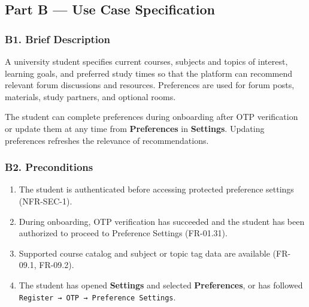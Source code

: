 \documentclass[12pt]{article}
\begin{document}
\hypertarget{sec:part-b-use-case-specification}{}
\subsection*{Part B --- Use Case Specification}
\par\medskip

\hypertarget{sec:b1-brief-description}{}
\subsubsection*{B1. Brief Description}
\par\medskip

A university student specifies current courses, subjects and topics of interest, learning goals, and preferred study times so that the platform can recommend relevant forum discussions and resources. Preferences are used for forum posts, materials, study partners, and optional rooms.
\par\medskip

The student can complete preferences during onboarding after OTP verification or update them at any time from \textbf{Preferences} in \textbf{Settings}. Updating preferences refreshes the relevance of recommendations.
\par\medskip

\hypertarget{sec:b2-preconditions}{}
\subsubsection*{B2. Preconditions}
\par\medskip

\begin{enumerate}
\item The student is authenticated before accessing protected preference settings (NFR-SEC-1).
\item During onboarding, OTP verification has succeeded and the student has been authorized to proceed to Preference Settings (FR-01.31).
\item Supported course catalog and subject or topic tag data are available (FR-09.1, FR-09.2).
\item The student has opened \textbf{Settings} and selected \textbf{Preferences}, or has followed \texttt{Register → OTP → Preference Settings}.
\end{enumerate}
\par\medskip
\end{document}
